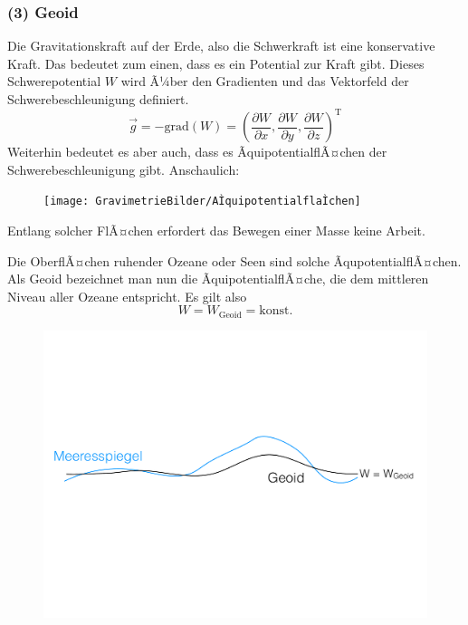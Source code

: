 \subsubsection{(3) Geoid}
Die Gravitationskraft auf der Erde, also die Schwerkraft ist eine konservative Kraft. Das bedeutet zum einen, dass es ein Potential zur Kraft gibt. Dieses Schwerepotential $W$ wird Ã¼ber den Gradienten und das Vektorfeld der Schwerebeschleunigung definiert.
\begin{equation*}
	\vec{g} = - \text{grad}(W) = \left( \frac{\partial W}{\partial x}, \frac{\partial W}{\partial y}, \frac{\partial W}{\partial z} \right)^{\text{T}}	
\end{equation*} 
Weiterhin bedeutet es aber auch, dass es ÃquipotentialflÃ¤chen der Schwerebeschleunigung gibt. Anschaulich:

\begin{figure}[H]
	\centering
	\texttt{[image: GravimetrieBilder/AÌquipotentialflaÌchen]}
\end{figure}
Entlang solcher FlÃ¤chen erfordert das Bewegen einer Masse keine Arbeit. 

Die OberflÃ¤chen ruhender Ozeane oder Seen sind solche ÃqupotentialflÃ¤chen. Als Geoid bezeichnet man nun die ÃquipotentialflÃ¤che, die dem mittleren Niveau aller Ozeane entspricht. Es gilt also \begin{equation*}
	W = W_{\text{Geoid}} = \text{konst.}
\end{equation*}

\begin{figure}[H]
	\centering
	\includegraphics[width = \textwidth]{GravimetrieBilder/Geoid}
\end{figure}

